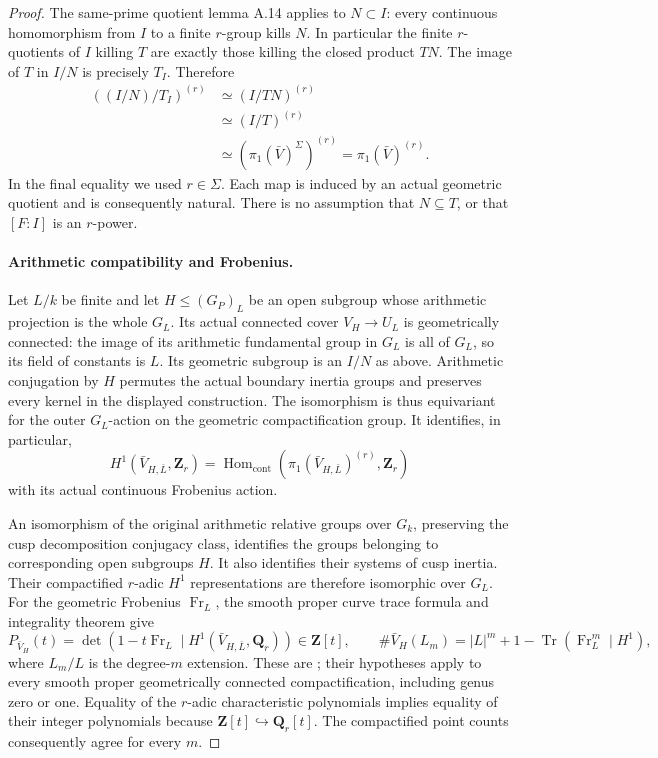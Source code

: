 \begin{proof}
The same-prime quotient lemma A.14 applies to $N\subset I$:
every continuous homomorphism from $I$ to a finite $r$-group
kills $N$. In particular the finite $r$-quotients of $I$ killing
$T$ are exactly those killing the closed product $TN$.
The image of $T$ in $I/N$ is precisely $T_I$. Therefore
\[
 \begin{aligned}
 ((I/N)/T_I)^{(r)}
   &\simeq (I/TN)^{(r)}\\
   &\simeq (I/T)^{(r)}\\
   &\simeq (\pi_1(\bar V)^\Sigma)^{(r)}
    =\pi_1(\bar V)^{(r)}.
 \end{aligned}
\]
In the final equality we used $r\in\Sigma$. Each map is induced
by an actual geometric quotient and is consequently natural.
There is no assumption that $N\subseteq T$, or that $[F:I]$
is an $r$-power.

\paragraph{Arithmetic compatibility and Frobenius.}
Let $L/k$ be finite and let $H\le(G_P)_L$ be an open subgroup
whose arithmetic projection is the whole $G_L$. Its actual
connected cover $V_H\to U_L$ is geometrically connected: the
image of its arithmetic fundamental group in $G_L$ is all of
$G_L$, so its field of constants is $L$. Its geometric subgroup
is an $I/N$ as above. Arithmetic conjugation by $H$ permutes
the actual boundary inertia groups and preserves every kernel
in the displayed construction. The isomorphism is thus equivariant
for the outer $G_L$-action on the geometric compactification group.
It identifies, in particular,
\[
 H^1(\bar V_{H,\bar L},\mathbf Z_r)
   =\operatorname{Hom}_{\mathrm{cont}}
        (\pi_1(\bar V_{H,\bar L})^{(r)},\mathbf Z_r)
\]
with its actual continuous Frobenius action.

An isomorphism of the original arithmetic relative groups over
$G_k$, preserving the cusp decomposition conjugacy class, identifies
the groups belonging to corresponding open subgroups $H$.
It also identifies their systems of cusp inertia. Their compactified
$r$-adic $H^1$ representations are therefore isomorphic over
$G_L$. For the geometric Frobenius $\operatorname{Fr}_L$, the
smooth proper curve trace formula and integrality theorem give
\[
 P_{\bar V_H}(t)=\det(1-t\operatorname{Fr}_L\mid
       H^1(\bar V_{H,\bar L},\mathbf Q_r))\in\mathbf Z[t],
 \qquad
 \#\bar V_H(L_m)=|L|^m+1-
       \operatorname{Tr}(\operatorname{Fr}_L^m\mid H^1),
\]
where $L_m/L$ is the degree-$m$ extension. These are
\citet[formula (1.5.1) and Theorem (1.6)]{WeilCurves}; their
hypotheses apply to every smooth proper geometrically connected
compactification, including genus zero or one. Equality of the
$r$-adic characteristic polynomials implies equality of their
integer polynomials because $\mathbf Z[t]\hookrightarrow\mathbf Q_r[t]$.
The compactified point counts consequently agree for every $m$.


\end{proof}
